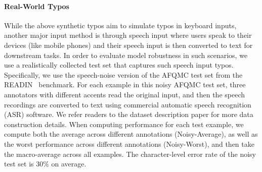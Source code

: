 \paragraph{Real-World Typos}
While the above synthetic typos aim to simulate typos in keyboard inputs, another major input method is through speech input where users speak to their devices (like mobile phones) and their speech input is then converted to text for downstream tasks. 
In order to evaluate model robustness in such scenarios, we use a realistically collected test set that captures such speech input typos. 
Specifically, we use the speech-noise version of the AFQMC test set from the READIN~\cite{READIN} benchmark. 
For each example in this noisy AFQMC test set, three annotators with different accents read the original input, and then the speech recordings are converted to text using commercial automatic speech recognition (ASR) software. We refer readers to the dataset description paper for more data construction details. 
When computing performance for each test example, we compute both the average across different annotations (Noisy-Average), as well as the worst performance across different annotations (Noisy-Worst), and then take the macro-average across all examples. The character-level error rate of the noisy test set is 30\% on average. 



